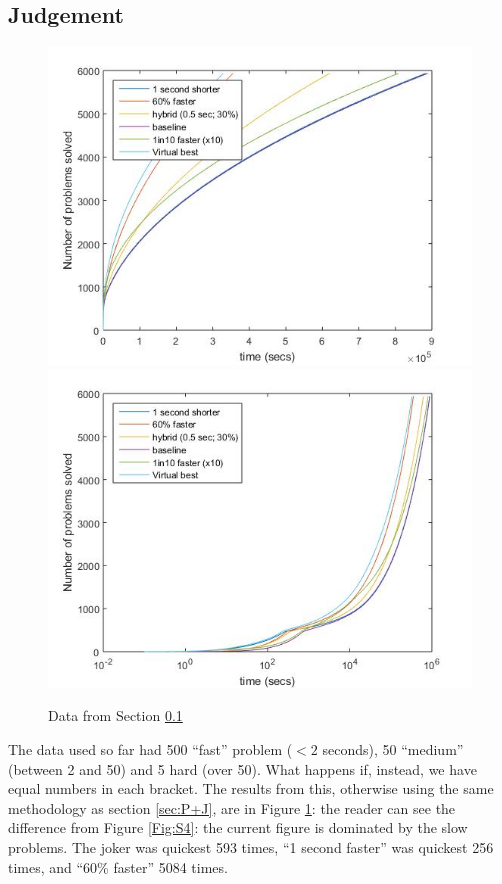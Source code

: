 \documentclass{easychair}
\begin{document}
\subsection{Judgement}\label{sec:J}
\begin{figure}[h]
\caption{Data from Section \ref{sec:J}\label{Fig:S5}}
\includegraphics[scale=0.60]{Fig5a.jpg}
\includegraphics[scale=0.60]{Fig5b.jpg}
\end{figure}
The data used so far had 500 ``fast'' problem ($<2$ seconds), 50 ``medium''  (between 2 and 50) and 5 hard (over 50). What happens if, instead, we have equal numbers in each bracket. The results from this, otherwise using the same methodology as section \ref{sec:P+J}, are in Figure \ref{Fig:S5}: the reader can see the difference from Figure \ref{Fig:S4}: the current figure is dominated by the slow problems. The joker was quickest 593 times, ``1 second faster'' was quickest 256 times, and ``60\% faster'' 5084 times.
\end{document}
